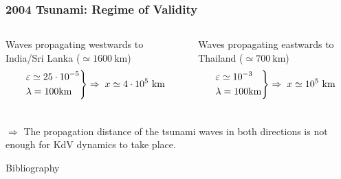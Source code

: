 \documentclass[fleqn]{beamer}
\begin{document}
    \begin{frame}
        \frametitle{2004 Tsunami: Regime of Validity}
        \begin{columns}
            Waves propagating westwards to India/Sri Lanka ($\simeq 1600\ \text{km}$)
            \begin{align}
                \begin{drcases}
                    \varepsilon \simeq 25\cdot 10^{-5}\\
                    \lambda = 100\text{km}
                \end{drcases}\Rightarrow\; x \simeq 4\cdot 10^{5}\ \text{km}\nonumber
            \end{align}

            Waves propagating eastwards to Thailand ($\simeq 700\ \text{km}$)
            \begin{align}
                \begin{drcases}
                    \varepsilon \simeq 10^{-3}\\
                    \lambda = 100\text{km}
                \end{drcases}\Rightarrow\; x \simeq 10^{5}\ \text{km}\nonumber
            \end{align}
        \end{columns}
        \vspace{0.5cm}
        \centering
        $\Rightarrow$ The propagation distance of the tsunami waves in both
        directions is not enough for KdV dynamics to take place.
    \end{frame}

    \begin{frame}{Bibliography}
        \nocite{johnson_1997}
        \nocite{vallis_2017}
        \nocite{constantin_tsunami}
        \nocite{rupert_2009}
        \nocite{mathe-physik}
        \printbibliography
    \end{frame}
\end{document}

